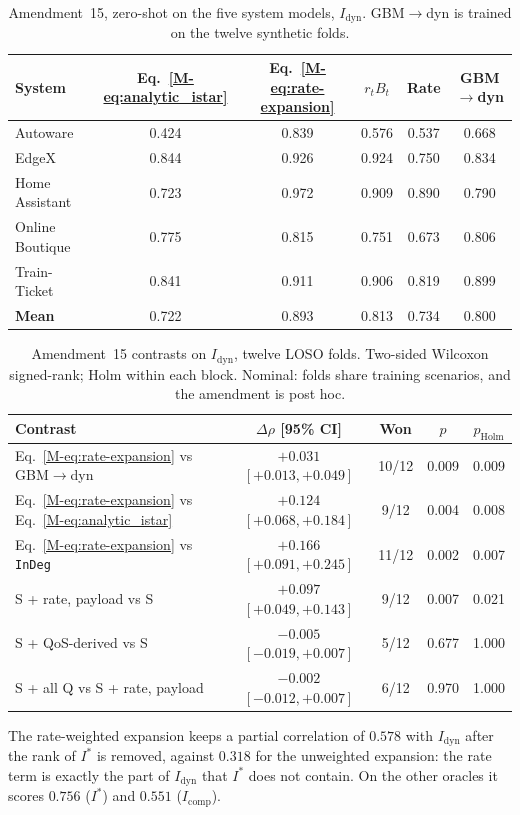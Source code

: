 \begin{table}[htbp]
\centering
\scriptsize
\caption{Amendment~15, zero-shot on the five system models, $I_{\text{dyn}}$. GBM$\to$dyn is trained on the twelve synthetic folds.}
\label{tab:a15-zeroshot}
\begin{tabular}{lccccc}
\toprule
\textbf{System} & Eq.~\eqref{M-eq:analytic_istar} & Eq.~\eqref{M-eq:rate-expansion} & $r_t B_t$ & Rate & GBM$\to$dyn \\
\midrule
Autoware & 0.424 & 0.839 & 0.576 & 0.537 & 0.668 \\
EdgeX & 0.844 & 0.926 & 0.924 & 0.750 & 0.834 \\
Home Assistant & 0.723 & 0.972 & 0.909 & 0.890 & 0.790 \\
Online Boutique & 0.775 & 0.815 & 0.751 & 0.673 & 0.806 \\
Train-Ticket & 0.841 & 0.911 & 0.906 & 0.819 & 0.899 \\
\midrule
\textbf{Mean} & 0.722 & 0.893 & 0.813 & 0.734 & 0.800 \\
\bottomrule
\end{tabular}
\end{table}

\begin{table}[htbp]
\centering
\scriptsize
\caption{Amendment~15 contrasts on $I_{\text{dyn}}$, twelve LOSO folds. Two-sided Wilcoxon signed-rank; Holm within each block. Nominal: folds share training scenarios, and the amendment is post hoc.}
\label{tab:a15-contrasts}
\begin{tabular}{lcccc}
\toprule
\textbf{Contrast} & $\Delta\rho$ [95\% CI] & Won & $p$ & $p_{\text{Holm}}$ \\
\midrule
Eq.~\eqref{M-eq:rate-expansion} vs GBM$\to$dyn & $+0.031$ $[+0.013, +0.049]$ & 10/12 & 0.009 & 0.009 \\
Eq.~\eqref{M-eq:rate-expansion} vs Eq.~\eqref{M-eq:analytic_istar} & $+0.124$ $[+0.068, +0.184]$ & 9/12 & 0.004 & 0.008 \\
Eq.~\eqref{M-eq:rate-expansion} vs \texttt{InDeg} & $+0.166$ $[+0.091, +0.245]$ & 11/12 & 0.002 & 0.007 \\
\midrule
S + rate, payload vs S & $+0.097$ $[+0.049, +0.143]$ & 9/12 & 0.007 & 0.021 \\
S + QoS-derived vs S & $-0.005$ $[-0.019, +0.007]$ & 5/12 & 0.677 & 1.000 \\
S + all Q vs S + rate, payload & $-0.002$ $[-0.012, +0.007]$ & 6/12 & 0.970 & 1.000 \\
\bottomrule
\end{tabular}
\end{table}

The rate-weighted expansion keeps a partial correlation of $0.578$ with $I_{\text{dyn}}$ after the rank of $I^*$ is removed, against $0.318$ for the unweighted expansion: the rate term is exactly the part of $I_{\text{dyn}}$ that $I^*$ does not contain. On the other oracles it scores $0.756$ ($I^*$) and $0.551$ ($I_{\text{comp}}$).
